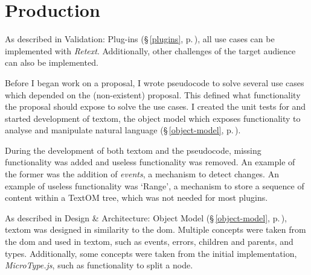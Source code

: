 
\begingroup
\let\clearpage\relax
\let\cleardoublepage\relax
\let\cleardoublepage\relax

\manualmark
{}

\chapter*{Production}\label{addendum-production}

As described in Validation: Plug-ins (§\,\ref{plugins},
  p.\,\pageref{plugins}), all use cases can be implemented with \emph{Retext}.
Additionally, other challenges of the target audience can also be
  implemented.

Before I began work on a proposal, I wrote pseudocode to solve several use
  cases which depended on the (non-existent) proposal.
This defined what functionality the proposal should expose to solve the use
  cases.
I created the unit tests for and started development of \gls{textom},
  the object model which exposes functionality to analyse and manipulate
  natural language (§\,\ref{object-model}, p.\,\pageref{object-model}).

During the development of both \gls{textom} and the pseudocode, missing
  functionality was added and useless functionality was removed.
An example of the former was the addition of \emph{events}, a mechanism to
  detect changes.
An example of useless functionality was `Range', a mechanism to store a
  sequence of content within a TextOM tree, which was not needed for
  most plugins.

As described in Design \& Architecture: Object Model (§\,\ref{object-model},
  p.\,\pageref{object-model}), \gls{textom} was designed in similarity to the
  \gls{dom}.
Multiple concepts were taken from the \gls{dom} and used in \gls{textom},
  such as events, errors, children and parents, and types.
Additionally, some concepts were taken from the initial implementation,
  \emph{MicroType.js}, such as functionality to split a node.

